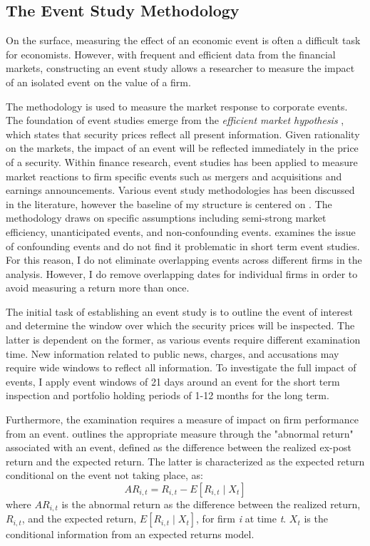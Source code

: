 \subsection{The Event Study Methodology}

On the surface, measuring the effect of an economic event is often a difficult task for economists. However, with frequent and efficient data from the financial markets, constructing an event study allows a researcher to measure the impact of an isolated event on the value of a firm.  

The methodology is used to measure the market response to corporate events. The foundation of event studies emerge from the \textit{efficient market hypothesis} \citep{fama1969_EMH}, which states that security prices reflect all present information. Given rationality on the markets, the impact of an event will be reflected immediately in the price of a security.  Within finance research, event studies has been applied to measure market reactions to firm specific events such as mergers and acquisitions and earnings announcements. Various event study methodologies has been discussed in the literature, however the baseline of my structure is centered on \citep{Event_studies}. The methodology draws on specific assumptions including semi-strong market efficiency, unanticipated events, and non-confounding events. \cite{sorescu2017event} examines the issue of confounding events
and do not find it problematic in short term event studies. For this reason, I do not eliminate overlapping events across different firms in the analysis. However, I do remove overlapping dates for individual firms in order to avoid measuring a return more than once.

The initial task of establishing an event study is to outline the event of interest and determine the window over which the security prices will be inspected. The latter is dependent on the former, as various events require different examination time. New information related to public news, charges, and accusations may require wide windows to reflect all information. To investigate the full impact of events, I apply event windows of 21 days around an event for the short term inspection and portfolio holding periods of 1-12 months for the long term. 

Furthermore, the examination requires a measure of impact on firm performance from an event. \cite{Event_studies} outlines the appropriate measure through the "abnormal return" associated with an event, defined as the difference between the realized ex-post return and the expected return. The latter is characterized as the expected return conditional on the event not taking place, as:  
\begin{equation}
    AR_{i,t} = R_{i,t} - E[R_{i,t} \mid X_t ]
\end{equation}
where $AR_{i,t}$ is the abnormal return as the difference between the realized return, $R_{i,t}$, and the expected return, $E[R_{i,t} \mid X_t ]$, for firm \textit{i} at time \textit{t}. $X_t$ is the conditional information from an expected returns model. 

